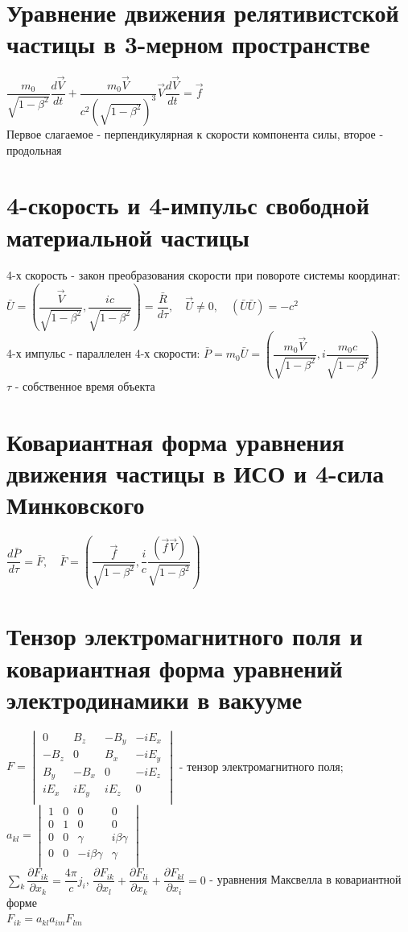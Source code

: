 \begin{multicols*}{2}
		\section{Уравнение движения релятивистской частицы в 3-мерном пространстве}
		$\dfrac{m_0}{\sqrt{1-\beta^2}}\dfrac{d\vec{V}}{dt} + \dfrac{m_0 \vec{V}}{c^2(\sqrt{1-\beta^2})^3}\vec{V} \dfrac{d\vec{V}}{dt} = \vec{f}$\\
		Первое слагаемое - перпендикулярная к скорости компонента силы, второе - продольная
		
		\section{4-скорость и 4-импульс свободной материальной частицы}
		4-х скорость - закон преобразования скорости при повороте системы координат:\\
		$\bar{U} = (\dfrac{\vec V}{\sqrt{1-\beta^2}}, \dfrac{ic}{\sqrt{1-\beta^2}}) = \dfrac{\bar{R}}{d\tau}, \quad \vec{U} \neq 0,\quad (\bar{U}\bar{U}) = -c^2$\\
		4-х импульс - параллелен 4-х скорости: $\bar{P} = m_0\bar{U} = (\dfrac{m_0\vec{V}}{\sqrt{1-\beta^2}}, i\dfrac{m_0c}{\sqrt{1-\beta^2}})$\\
		$\tau$ - собственное время объекта
		
		\section{Ковариантная форма уравнения движения частицы в ИСО и 4-сила Минковского}
		$\dfrac{d\bar{P}}{d\tau} = \bar{F},\quad \bar{F} = (\dfrac{\vec{f}}{\sqrt{1-\beta^2}}, \dfrac{i}{c}\dfrac{(\vec{f}\vec{V})}{\sqrt{1-\beta^2}})$
		
		\section{Тензор электромагнитного поля и ковариантная форма уравнений электродинамики в вакууме}
		$F = \begin{vmatrix}
			0& B_{z}& -B_{y}& -iE_x\\
			-B_{z}& 0& B_{x}& -iE_y\\
			B_{y}& -B_{x}& 0& -iE_z\\
			iE_x& iE_y& iE_z& 0 \\
		\end{vmatrix}$ - тензор электромагнитного поля;~~
		$a_{kl} = \begin{vmatrix}
			1& 0& 0& 0\\
			0& 1& 0& 0\\
			0& 0& \gamma & i\beta \gamma \\
			0& 0& -i\beta \gamma& \gamma  \\
		\end{vmatrix}$\\
		$\sum_{k}^{} \dfrac{\partial F_{ik}}{\partial x_k} = \dfrac{4\pi}{c}j_i$, \quad $\dfrac{\partial F_{ik}}{\partial x_l} + \dfrac{\partial F_{li}}{\partial x_k} + \dfrac{\partial F_{kl}}{\partial x_i} = 0$ - уравнения Максвелла в ковариантной форме\\
		$F_{ik} = a_{kl} a_{im} F_{lm}$
		

\end{multicols*}
